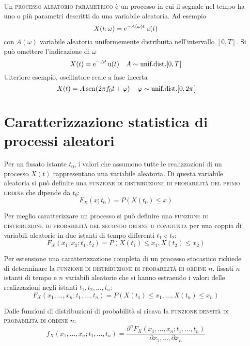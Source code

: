 Un \textsc{processo aleatorio parametrico} è un processo in cui il segnale nel tempo ha uno o più parametri descritti da una variabile aleatoria. Ad esempio
\[
	X(t;\omega)=\operatorname{e}^{-A(\omega)t}\operatorname{u}(t)
\]
con $A(\omega)$ variabile aleatoria uniformemente distribuita nell'intervallo $[0,T]$.
Si può omettere l'indicazione di $\omega$
\[
	X(t)=\operatorname{e}^{-A t}\operatorname{u}(t)\quad A\sim\text{unif.dist.}[0,T]
\]
Ulteriore esempio, oscillatore reale a fase incerta
\[
	X(t)=A\,{\operatorname{sen}}^{}\!\left({2\pi f_0 t+\varphi}\right)\quad \varphi\sim\text{unif.dist.} [0,2\pi[
\]

\section{Caratterizzazione statistica di processi aleatori}
Per un fissato istante $t_0$, i valori che assumono tutte le realizzazioni di un processo $X(t)$ rappresentano una variabile aleatoria. Di questa variabile aleatoria si può definire una \textsc{funzione di distribuzione di probabilità del primo ordine} che dipende da $t_0$:
\begin{equation}
	F_X(x;t_0)=P(X(t_0)\leq x)
\end{equation}

Per meglio caratterizzare un processo si può definire una \textsc{funzione di distribuzione di probabilità del secondo ordine o congiunta} per una coppia di variabili aleatorie in due istanti di tempo differenti $t_1$ e $t_2$:
\begin{equation}
	F_X(x_1,x_2;t_1,t_2)=P(X(t_1)\leq x_1,X(t_2)\leq x_2)
\end{equation}

Per estensione una caratterizzazione completa di un processo stocastico richiede di determinare la \textsc{funzione di distribuzione di probabilità di ordine $n$}, fissati $n$ istanti di tempo e $n$ variabili aleatorie che si hanno estraendo i valori delle realizzazioni negli istanti $t_1,t_2,\dots,t_n$:
\begin{equation}
	F_X(x_1,\dots,x_n;t_1,\dots,t_n)=P(X(t_1)\leq x_1,\dots,X(t_n)\leq x_n)
\end{equation}

Dalle funzioni di distribuzioni di probabilità si ricava la \textsc{funzione densità di probabilità di ordine $n$}:
\begin{equation}
	f_X(x_1,\dots,x_n;t_1,\dots,t_n)=\frac{\partial^n F_X(x_1,\dots,x_n;t_1,\dots,t_n)}{\partial x_1,\dots,\partial x_n}
\end{equation}

